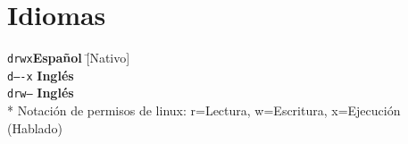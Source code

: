\documentclass[11pt,a4paper,sans]{moderncv}
\newcommand{\sectionMargin}{-3mm}
\begin{document}
\vspace*{\sectionMargin}

\section{Idiomas}{
\begin{tabbing}
    \texttt{drwx}\hspace{1mm}\= \textbf{Español}    \hspace{1mm}\=  [Nativo] \\
    \texttt{d----x} \>          \textbf{Inglés}     \>              [B1] \\
    \texttt{drw--}  \>          \textbf{Inglés}     \>              [Técnico] \\
    \** Notación de permisos de linux: r=Lectura, w=Escritura, x=Ejecución (Hablado)
\end{tabbing}
}
\end{document}
